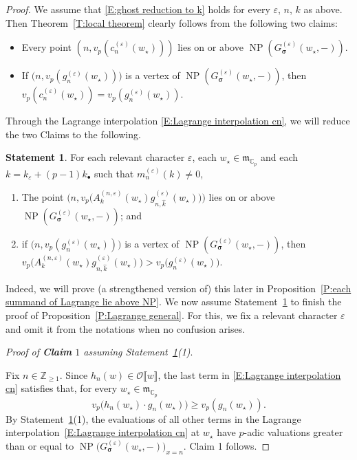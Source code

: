 \documentclass[12pt]{amsart}
\theoremstyle{definition}
\newtheorem{statement}[subsection]{Statement}
\numberwithin{equation}{subsection}
\def\calO{\mathcal{O}}
\def\gothm{\mathfrak{m}}
\def\CC{\mathbb{C}}
\def\ZZ{\mathbb{Z}}
\DeclareMathOperator{\NP}{NP}
\newcommand{\bbsigma}{\boldsymbol{\sigma}}
\begin{document}
\begin{proof}%
We assume that \eqref{E:ghost reduction to k} holds for every $\varepsilon$, $n$, $k$ as above. Then Theorem~\ref{T:local theorem} clearly follows from the following two claims:
\begin{itemize}
\item[\underline{{\bf Claim} 1}] Every point $(n,v_p(c_n^{(\varepsilon)}(w_\star)))$ lies on or above $\NP(G_{\bbsigma}^{(\varepsilon)}(w_\star, -))$.
\item[\underline{{\bf Claim} 2}] If $\big(n, v_p(g^{(\varepsilon)}_n(w_\star))\big)$ is a vertex of $\NP(G_{\bbsigma}^{(\varepsilon)}(w_\star, -))$, then $v_p(c_n^{(\varepsilon)}(w_\star)) = v_p(g_n^{(\varepsilon)}(w_\star))$.
\end{itemize}

Through the Lagrange interpolation \eqref{E:Lagrange interpolation cn}, we will reduce the two Claims to the following.
\begin{statement}
\label{ST:each summand of Lagrange lie above NP}
For each relevant character $\varepsilon$, each $w_\star \in \gothm_{\CC_p}$ and each $k = k_\varepsilon+(p-1)k_\bullet$ such that $m_n^{(\varepsilon)}(k) \neq 0$,
\begin{enumerate}
\item The point $\big(n, v_p\big(A_k^{(n,\varepsilon)}(w_\star) g^{(\varepsilon)}_{n,\hat k}(w_\star) \big) \big)$ lies on or above $\NP(G_{\bbsigma}^{(\varepsilon)}(w_\star, -))$; and
\item if $\big(n, v_p(g_n^{(\varepsilon)}(w_\star))\big)$ is a vertex of $\NP(G_{\bbsigma}^{(\varepsilon)}(w_\star, -))$, then $v_p\big(A_k^{(n,\varepsilon)}(w_\star) g^{(\varepsilon)}_{n,\hat k}(w_\star) \big) > v_p\big(g_n^{(\varepsilon)}(w_\star)\big)$.
\end{enumerate}
\end{statement}
Indeed, we will prove (a strengthened version of) this later in Proposition~\ref{P:each summand of Lagrange lie above NP}. We now assume Statement~\ref{ST:each summand of Lagrange lie above NP} to finish the proof of Proposition~\ref{P:Lagrange general}. For this, we fix a relevant character $\varepsilon$ and omit it from the notations when no confusion arises.

\medskip
\noindent
\emph{Proof of {\bf Claim} $1$ assuming Statement~\ref{ST:each summand of Lagrange lie above NP}(1)}.  

Fix $n\in \ZZ_{\geq 1}$.
Since $h_n(w) \in \calO\llbracket w\rrbracket$, the last term in \eqref{E:Lagrange interpolation cn} satisfies that, for every $w_\star \in \gothm_{\CC_p}$
$$
v_p \big( h_n(w_\star) \cdot g_n(w_\star) \big) \geq v_p (g_n(w_\star)).
$$
By Statement~\ref{ST:each summand of Lagrange lie above NP}(1), the evaluations of all other terms in the Lagrange interpolation~\eqref{E:Lagrange interpolation cn} at $w_\star$ have $p$-adic valuations greater than or equal to $\NP \big(G_{\bbsigma}^{(\varepsilon)}(w_\star, -)\big)_{x=n}$. Claim 1 follows.


\end{proof}
\end{document}
